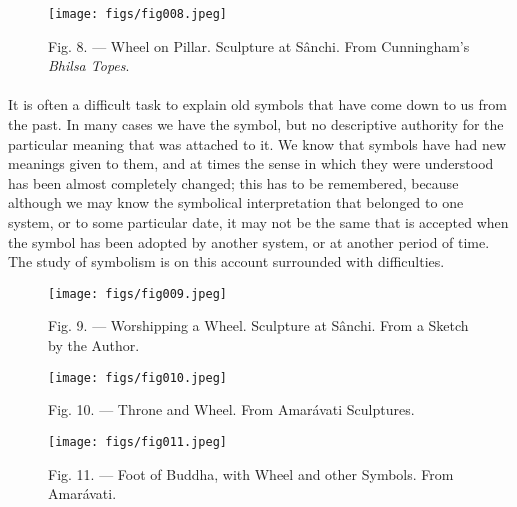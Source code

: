 \documentclass[a4paper, 11pt, oneside, polutonikogreek, english]{article}
\begin{document}
\begin{figure}[H]
\centering
\texttt{[image: figs/fig008.jpeg]}
\caption{Fig. 8. --- Wheel on Pillar. Sculpture at Sânchi. From Cunningham's \emph{Bhilsa Topes}.}
\end{figure}
\paragraph{}
It is often a difficult task to explain old symbols that have come down to us from the past. In many cases we have the symbol, but no descriptive authority for the particular meaning that was attached to it. We know that symbols have had new meanings given to them, and at times the sense in which they were understood has been almost completely changed; this has to be remembered, because although we may know the symbolical interpretation that belonged to one system, or to some particular date, it may not be the same that is accepted when the symbol has been adopted by another system, or at another period of time. The study of symbolism is on this account surrounded with difficulties.

\begin{figure}[H]
\centering
\texttt{[image: figs/fig009.jpeg]}
\caption{Fig. 9. --- Worshipping a Wheel. Sculpture at Sânchi. From a Sketch by the Author.}
\end{figure}

\begin{figure}[H]
\centering
\texttt{[image: figs/fig010.jpeg]}
\caption{Fig. 10. --- Throne and Wheel. From Amarávati Sculptures.}
\end{figure}

\begin{figure}[H]
\centering
\texttt{[image: figs/fig011.jpeg]}
\caption{Fig. 11. --- Foot of Buddha, with Wheel and other Symbols. From Amarávati.}
\end{figure}
\end{document}
